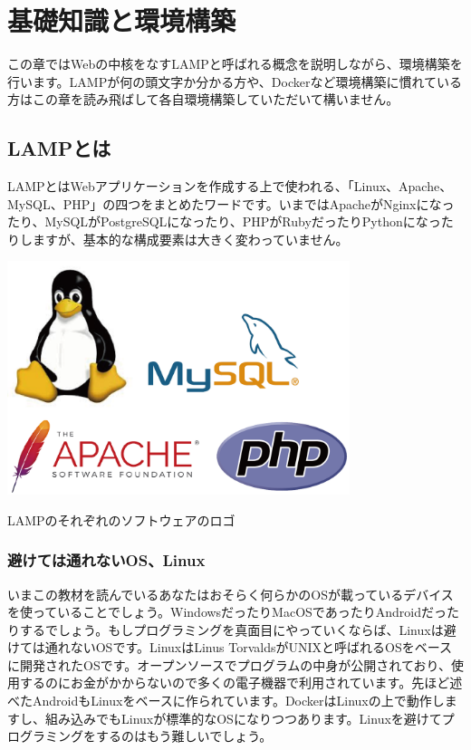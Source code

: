 \chapter{基礎知識と環境構築}

この章ではWebの中核をなすLAMPと呼ばれる概念を説明しながら、環境構築を行います。LAMPが何の頭文字か分かる方や、Dockerなど環境構築に慣れている方はこの章を読み飛ばして各自環境構築していただいて構いません。

\section{LAMPとは}

LAMPとはWebアプリケーションを作成する上で使われる、「Linux、Apache、MySQL、PHP」の四つをまとめたワードです。いまではApacheがNginxになったり、MySQLがPostgreSQLになったり、PHPがRubyだったりPythonになったりしますが、基本的な構成要素は大きく変わっていません。

\begin{center}
\includegraphics[width=10cm]{./chap1_fig/LAMP.png}

LAMPのそれぞれのソフトウェアのロゴ
\end{center}

\subsection{避けては通れないOS、Linux}

いまこの教材を読んでいるあなたはおそらく何らかのOSが載っているデバイスを使っていることでしょう。WindowsだったりMacOSであったりAndroidだったりするでしょう。もしプログラミングを真面目にやっていくならば、Linuxは避けては通れないOSです。LinuxはLinus TorvaldsがUNIXと呼ばれるOSをベースに開発されたOSです。オープンソースでプログラムの中身が公開されており、使用するのにお金がかからないので多くの電子機器で利用されています。先ほど述べたAndroidもLinuxをベースに作られています。DockerはLinuxの上で動作しますし、組み込みでもLinuxが標準的なOSになりつつあります。Linuxを避けてプログラミングをするのはもう難しいでしょう。

